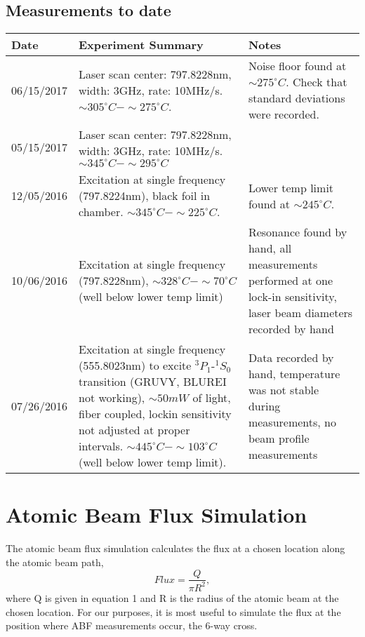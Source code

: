 \documentclass[12pt, a4paper]{article}
\begin{document}
\subsection{Measurements to date}
\begin{center}
\begin{table}[!h]
\begin{tabular}{||p{2cm}|p{8cm}|p{5cm}||}
\hline
Date & Experiment Summary & Notes\\
\hline\hline
06/15/2017 & Laser scan center: 797.8228nm, width: 3GHz, rate: 10MHz/s. $\sim305^{\circ}C-\sim275^{\circ}C$. &  Noise floor found at $\sim275^{\circ}C$. Check that standard deviations were recorded.\\
\hline
05/15/2017 & Laser scan center: 797.8228nm, width: 3GHz, rate: 10MHz/s. $\sim345^{\circ}C-\sim295^{\circ}C$ & \\
\hline 
12/05/2016 & Excitation at single frequency (797.8224nm), black foil in chamber. $\sim345^{\circ}C-\sim225^{\circ}C$. &  Lower temp limit found at $\sim245^{\circ}C$. \\
\hline
10/06/2016 & Excitation at single frequency (797.8228nm), $\sim328^{\circ}C-\sim70^{\circ}C$ (well below lower temp limit) & Resonance found by hand, all measurements performed at one lock-in sensitivity, laser beam diameters recorded by hand\\
\hline
07/26/2016 & Excitation at single frequency (555.8023nm) to excite $^{3}P_{1}$-$ ^{1}S_{0}$ transition (GRUVY, BLUREI not working), $\sim50mW$ of light, fiber coupled, lockin sensitivity not adjusted at proper intervals. $\sim445^{\circ}C-\sim103^{\circ}C$ (well below lower temp limit). & Data recorded by hand, temperature was not stable during measurements, no beam profile measurements\\
\hline
\end{tabular}
\end{table}
\end{center}


\section{Atomic Beam Flux Simulation}
The atomic beam flux simulation calculates the flux at a chosen location along the atomic beam path,
\begin{equation}
Flux = \frac{Q}{\pi R^{2}},
\end{equation}
where Q is given in equation 1 and R is the radius of the atomic beam at the chosen location. For our purposes, it is most useful to simulate the flux at the position where ABF measurements occur, the 6-way cross. 
\end{document}
